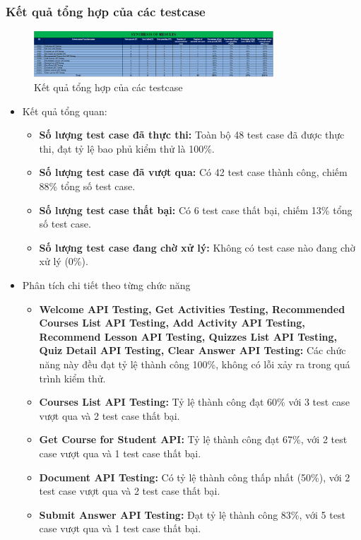 \subsubsection{Kết quả tổng hợp của các testcase}
\begin{figure}[H]
    \centering
    \includegraphics[width=0.8\textwidth]{Images/test/synthesisResults.png}
    \caption{Kết quả tổng hợp của các testcase}
\end{figure}
\begin{itemize}
    \item Kết quả tổng quan:
    \begin{itemize}
        \item \textbf{Số lượng test case đã thực thi:} Toàn bộ 48 test case đã được thực thi, đạt tỷ lệ bao phủ kiểm thử là 100\%.
        \item \textbf{Số lượng test case đã vượt qua:} Có 42 test case thành công, chiếm 88\% tổng số test case.
        \item \textbf{Số lượng test case thất bại:} Có 6 test case thất bại, chiếm 13\% tổng số test case.
        \item \textbf{Số lượng test case đang chờ xử lý:} Không có test case nào đang chờ xử lý (0\%).
    \end{itemize}
    \item Phân tích chi tiết theo từng chức năng
    \begin{itemize}
        \item \textbf{Welcome API Testing, Get Activities Testing, Recommended Courses List API Testing, Add Activity API Testing, Recommend Lesson API Testing, Quizzes List API Testing, Quiz Detail API Testing, Clear Answer API Testing:} 
        Các chức năng này đều đạt tỷ lệ thành công 100\%, không có lỗi xảy ra trong quá trình kiểm thử.
        
        \item \textbf{Courses List API Testing:} Tỷ lệ thành công đạt 60\% với 3 test case vượt qua và 2 test case thất bại.
        
        \item \textbf{Get Course for Student API:} Tỷ lệ thành công đạt 67\%, với 2 test case vượt qua và 1 test case thất bại.
        
        \item \textbf{Document API Testing:} Có tỷ lệ thành công thấp nhất (50\%), với 2 test case vượt qua và 2 test case thất bại.
        
        \item \textbf{Submit Answer API Testing:} Đạt tỷ lệ thành công 83\%, với 5 test case vượt qua và 1 test case thất bại.
    \end{itemize}
\end{itemize}

